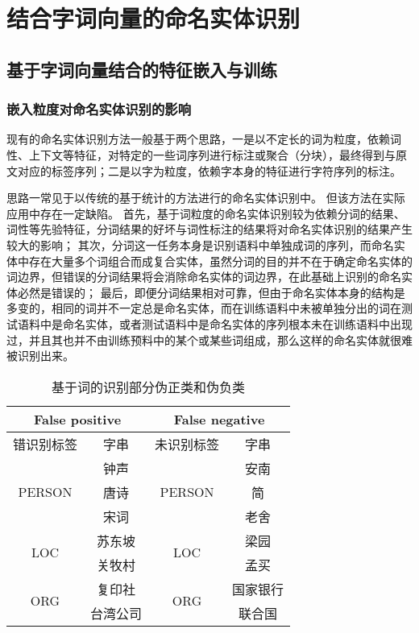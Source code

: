 \chapter{结合字词向量的命名实体识别}
\section{基于字词向量结合的特征嵌入与训练}
\subsection{嵌入粒度对命名实体识别的影响}
\label{subsec:analyze}
现有的命名实体识别方法一般基于两个思路，一是以不定长的词为粒度，依赖词性、上下文等特征，对特定的一些词序列进行标注或聚合（分块），最终得到与原文对应的标签序列；二是以字为粒度，依赖字本身的特征进行字符序列的标注。

思路一常见于以传统的基于统计的方法进行的命名实体识别中。
但该方法在实际应用中存在一定缺陷。
首先，基于词粒度的命名实体识别较为依赖分词的结果、词性等先验特征，分词结果的好坏与词性标注的结果将对命名实体识别的结果产生较大的影响；
其次，分词这一任务本身是识别语料中单独成词的序列，而命名实体中存在大量多个词组合而成复合实体，虽然分词的目的并不在于确定命名实体的词边界，但错误的分词结果将会消除命名实体的词边界，在此基础上识别的命名实体必然是错误的；
最后，即便分词结果相对可靠，但由于命名实体本身的结构是多变的，相同的词并不一定总是命名实体，而在训练语料中未被单独分出的词在测试语料中是命名实体，或者测试语料中是命名实体的序列根本未在训练语料中出现过，并且其也并不由训练预料中的某个或某些词组成，那么这样的命名实体就很难被识别出来。

\begin{table}[H]
    \centering
    \caption{基于词的识别部分伪正类和伪负类}
    \begin{tabular}{cccc}
        \toprule
        \multicolumn{2}{c}{False positive} & \multicolumn{2}{c}{False negative}\\
        \midrule
        错识别标签 & 字串 & 未识别标签 & 字串\\
        \cmidrule(lr){1-2}\cmidrule(lr){3-4}
        \multirow{3}{*}{PERSON} & 钟声 & \multirow{3}{*}{PERSON} & 安南 \\
        & 唐诗 & & 简 \\
        & 宋词 & & 老舍\\
        \cmidrule(lr){1-2}\cmidrule(lr){3-4}
        \multirow{2}{*}{LOC} & 苏东坡 & \multirow{2}{*}{LOC}& 梁园\\
        & 关牧村 & & 孟买 \\
        \cmidrule(lr){1-2}\cmidrule(lr){3-4}
        \multirow{2}{*}{ORG} & 复印社 & \multirow{2}{*}{ORG}& 国家银行\\
        & 台湾公司 & & 联合国\\
        \bottomrule
    \end{tabular}
    \label{tab:fp_fn_word}
\end{table}

